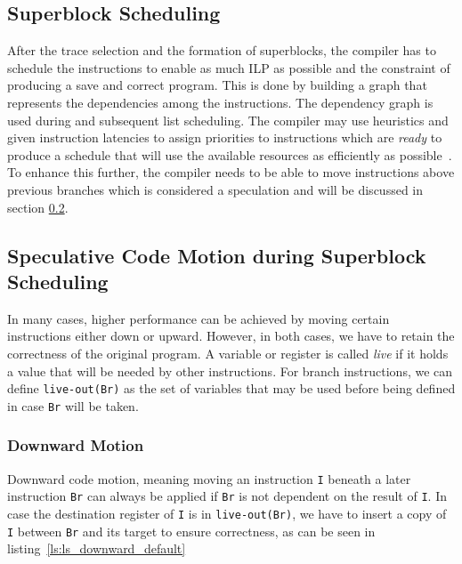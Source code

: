 \subsection{Superblock Scheduling}
After the trace selection and the formation of superblocks, the compiler has to schedule the instructions to enable as much ILP as possible and the constraint of producing a save and correct program. This is done by building a graph that represents the dependencies among the instructions. The dependency graph is used during and subsequent list scheduling. The compiler may use heuristics and given instruction latencies to assign priorities to instructions which are \textit{ready} to produce a schedule that will use the available resources as efficiently as possible~\cite{chang95}. To enhance this further, the compiler needs to be able to move instructions above previous branches which is considered a speculation and will be discussed in section \ref{sec:spec_motion}. 

\subsection{Speculative Code Motion during Superblock Scheduling}
\label{sec:spec_motion}
In many cases, higher performance can be achieved by moving certain instructions either down or upward. However, in both cases, we have to retain the correctness of the original program. A variable or register is called \textit{live} if it holds a value that will be needed by other instructions.  For branch instructions, we can define \texttt{live-out(Br)} as the set of variables that may be used before being defined in case \texttt{Br} will be taken.

\subsubsection{Downward Motion}
Downward code motion, meaning moving an instruction \texttt{I} beneath a later instruction \texttt{Br} can always be applied if \texttt{Br} is not dependent on the result of \texttt{I}. In case the destination register of \texttt{I} is in \texttt{live-out(Br)}, we have to insert a copy of \texttt{I} between \texttt{Br} and its target to ensure correctness, as can be seen in listing~\ref{ls:ls_downward_default}

